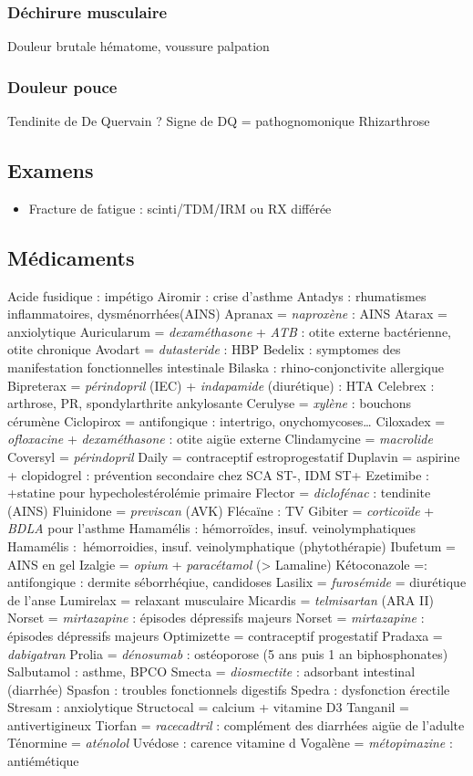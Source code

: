 \documentclass[11pt]{article}
\begin{document}
\subsubsection{Déchirure musculaire}
\label{sec:org22b9cb5}
Douleur brutale \textpm{} hématome, voussure palpation
\subsubsection{Douleur pouce}
\label{sec:org0f69b45}
Tendinite de De Quervain ? Signe de DQ = pathognomonique
Rhizarthrose
\subsection{Examens}
\label{sec:orge3f312a}
\begin{itemize}
\item Fracture de fatigue : scinti/TDM/IRM ou RX différée
\end{itemize}
\subsection{Médicaments}
\label{sec:org94943d3}
Acide fusidique : impétigo
Airomir : crise d'asthme
Antadys : rhumatismes inflammatoires, dysménorrhées(AINS)
Apranax = \emph{naproxène} : AINS
Atarax = anxiolytique
Auricularum = \emph{dexaméthasone} + \emph{ATB} : otite externe bactérienne, otite chronique
Avodart = \emph{dutasteride} : HBP
Bedelix : symptomes des manifestation fonctionnelles intestinale
Bilaska : rhino-conjonctivite allergique
Bipreterax = \emph{périndopril} (IEC) + \emph{indapamide} (diurétique) : HTA
Celebrex : arthrose, PR, spondylarthrite ankylosante
Cerulyse = \emph{xylène} : bouchons cérumène
Ciclopirox = antifongique : intertrigo, onychomycoses\ldots{}
Ciloxadex = \emph{ofloxacine} + \emph{dexaméthasone} : otite aigüe externe
Clindamycine = \emph{macrolide}
Coversyl = \emph{périndopril}
Daily = contraceptif estroprogestatif
Duplavin = aspirine + clopidogrel : prévention secondaire chez SCA ST-, IDM ST+
Ezetimibe : +statine pour hypecholestérolémie primaire
Flector = \emph{diclofénac} : tendinite (AINS)
Fluinidone = \emph{previscan} (AVK)
Flécaïne : TV
Gibiter = \emph{corticoïde} + \emph{BDLA} pour l'asthme
Hamamélis : hémorroïdes, insuf. veinolymphatiques
Hamamélis : hémorroidies, insuf. veinolymphatique (phytothérapie)
Ibufetum = AINS en gel
Izalgie = \emph{opium} + \emph{paracétamol} (> Lamaline)
Kétoconazole =: antifongique  : dermite séborrhéqiue, candidoses
Lasilix = \emph{furosémide} = diurétique de l'anse
Lumirelax = relaxant musculaire
Micardis = \emph{telmisartan} (ARA II)
Norset = \emph{mirtazapine} : épisodes dépressifs majeurs
Norset = \emph{mirtazapine} : épisodes dépressifs majeurs
Optimizette = contraceptif progestatif
Pradaxa = \emph{dabigatran}
Prolia = \emph{dénosumab} : ostéoporose (5 ans puis 1 an biphosphonates)
Salbutamol : asthme, BPCO
Smecta = \emph{diosmectite} : adsorbant intestinal (diarrhée)
Spasfon : troubles fonctionnels digestifs
Spedra : dysfonction érectile
Stresam : anxiolytique
Structocal = calcium + vitamine D3
Tanganil = antivertigineux
Tiorfan = \emph{racecadtril} : complément des diarrhées aigüe de l'adulte
Ténormine = \emph{aténolol}
Uvédose : carence vitamine d
Vogalène = \emph{métopimazine} : antiémétique
\end{document}
